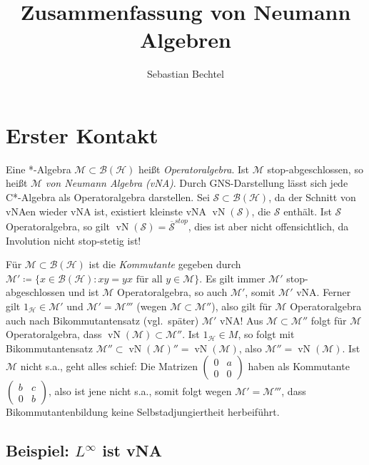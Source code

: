 \documentclass[11pt,a4paper]{scrartcl}
\newcommand{\Hc}{\mathcal{H}}
\newcommand{\Sc}{\mathcal{S}}
\newcommand{\B}{\mathcal{B}}
\newcommand{\M}{\mathcal{M}}
\theoremstyle{plain}
\theoremstyle{definition}
\theoremstyle{remark}
\DeclareMathOperator{\vN}{vN}
\begin{document}
\title{Zusammenfassung von Neumann Algebren}
\author{Sebastian Bechtel}
\maketitle

\section{Erster Kontakt}

Eine *-Algebra $\M \subset \B(\Hc)$ heißt \emph{Operatoralgebra}. Ist $\M$ stop-abgeschlossen, so heißt $\M$ \emph{von Neumann Algebra (vNA)}. Durch GNS-Darstellung lässt sich jede C*-Algebra als Operatoralgebra darstellen. Sei $\Sc \subset \B(\Hc)$, da der Schnitt von vNAen wieder vNA ist, existiert kleinste vNA $\vN(\Sc)$, die $\Sc$ enthält. Ist $\Sc$ Operatoralgebra, so gilt $\vN(\Sc)=\overline{\Sc}^{stop}$, dies ist aber nicht offensichtlich, da Involution nicht stop-stetig ist!

Für $\M \subset \B(\Hc)$ ist die \emph{Kommutante} gegeben durch $\M'\coloneqq \{ x\in\B(\Hc): xy=yx \text{ für all } y\in \M \}$. Es gilt immer $\M'$ stop-abgeschlossen und ist $\M$ Operatoralgebra, so auch $\M'$, somit $\M'$ vNA\@. Ferner gilt $1_\Hc\in \M'$ und $\M'=\M'''$ (wegen $\M\subset \M''$), also gilt für $\M$ Operatoralgebra auch nach Bikommutantensatz (vgl.\ später) $\M'$ vNA\@! Aus $\M \subset \M''$ folgt für $\M$ Operatoralgebra, dass $\vN(\M)\subset \M''$. Ist $1_\Hc\in M$, so folgt mit Bikommutantensatz $\M''\subset \vN(\M)''=\vN(\M)$, also $\M''=\vN(\M)$. Ist $\M$ nicht s.a., geht alles schief: Die Matrizen $\left(\begin{smallmatrix} 0 & a \\ 0 & 0 \end{smallmatrix}\right)$ haben als Kommutante $\left(\begin{smallmatrix} b & c \\ 0 & b \end{smallmatrix}\right)$, also ist jene nicht s.a., somit folgt wegen $\M'=\M'''$, dass Bikommutantenbildung keine Selbstadjungiertheit herbeiführt.

\subsection{Beispiel: $L^\infty$ ist vNA}
\end{document}
